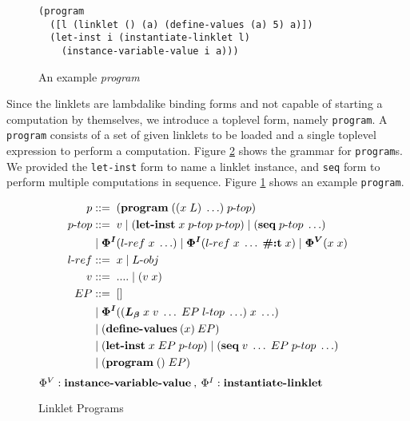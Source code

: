 \documentclass[sigplan,screen,anonymous]{acmart}
\def\dash {\text{-}}
\begin{document}
\begin{figure}[h]
\begin{verbatim}
(program
  ([l (linklet () (a) (define-values (a) 5) a)])
  (let-inst i (instantiate-linklet l)
    (instance-variable-value i a)))
\end{verbatim}
\caption{An example \textit{program}}
\label{fig:program-example}
\end{figure}

Since the linklets are lambda\dash like binding forms and not capable
of starting a computation by themselves, we introduce a top\dash level
form, namely \verb|program|. A \verb|program| consists of a set of
given linklets to be loaded and a single top\dash level expression to
perform a computation. Figure \ref{fig:linklet-program} shows the
grammar for \verb|program|s. We provided the \verb|let-inst| form to
name a linklet instance, and \verb|seq| form to perform multiple
computations in sequence. Figure \ref{fig:program-example} shows an
example \verb|program|.



\begin{figure}[h!]
  \begin{align*}
    p           &::=\; (\textbf{program}\; ((x\; L)\; \ldots)\; p\dash top) \\
    p\dash top  &::=\; v\; |\; (\textbf{let\dash inst}\; x\; p\dash top\;p\dash top)\; |\; (\textbf{seq}\; p\dash top\; \ldots) \\
    \;          &\;|\; \bm{\Phi^I}(l\dash ref\; x\; \ldots)\; |\; \bm{\Phi^I}(l\dash ref\; x\; \ldots\; \textbf{\#:t}\; x)\; |\; \bm{\Phi^V}(x\; x) \\
    l\dash ref &::=\; x\; |\; L\dash obj \\
    v           &::=\; ....\;|\;(v\;x) \\
    EP          &::=\; [] \\
    \;          &\;|\; \bm{\Phi^I}((\lb\; x\; v\; \ldots\; EP\; l\dash top\; \ldots)\; x\; \ldots) \\
    \;          &\;|\; (\textbf{define\dash values}\:(x)\:EP) \\
    \;          &\;|\; (\textbf{let\dash inst}\; x\; EP\; p\dash top)\; |\; (\textbf{seq}\; v\; \ldots\; EP\; p\dash top\; \ldots) \\
    \;          &\;|\; (\textbf{program}\; ()\; EP) \\
  \end{align*}
  \hfill \footnotesize $\Phi^V : \textbf{instance\dash variable\dash value}\:,\: \Phi^I : \textbf{instantiate\dash linklet}$
\caption{Linklet Programs}
\label{fig:linklet-program}
\end{figure}
\end{document}
